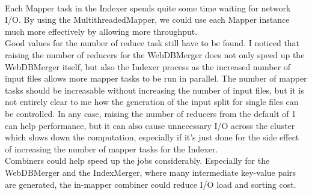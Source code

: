 \documentclass[10pt,a4paper]{report}
\begin{document}
\\
Each Mapper task in the Indexer spends quite some time waiting for network I/O. By using the MultithreadedMapper, we could use each Mapper instance much more effectively by allowing more throughput.
\\
Good values for the number of reduce task still have to be found. I noticed that raising the number of reducers for the WebDBMerger does not only speed up the WebDBMerger itself,
but also the Indexer process as the increased number of input files allows more mapper tasks to be run in parallel. The number of mapper tasks should be increasable without increasing the number of input files, but it is not entirely clear to me how the generation of the input split for single files can be controlled. In any case, raising the number of reducers from the default of 1 can help performance, but it can also cause unnecessary I/O across the cluster which slows down the computation, especially if it's just done for the side effect of increasing the number of mapper tasks for the Indexer.
\\
Combiners could help speed up the jobs considerably. Especially for the WebDBMerger and the IndexMerger, where many intermediate key-value pairs are generated, the in-mapper combiner could reduce I/O load and sorting cost.
\end{document}
